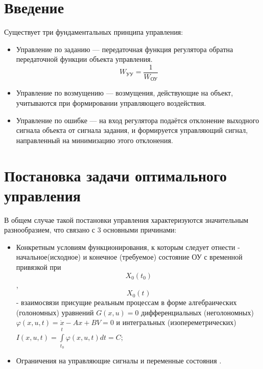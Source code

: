 \documentclass[preprint,russian,a5paper,10pt,twoside]{ncc}
\begin{document}

\setcounter{page}{2}
\thispagestyle{empty}
\mbox{}
\newpage
\tableofcontents
\newpage

\section{Введение\label{intro}}

Существует три фундаментальных принципа управления:
\begin{itemize}
\item Управление по заданию --- передаточная функция регулятора обратна передаточной функции объекта управления.
\begin{equation}
W_{\text{УУ}}=\frac{1}{W_{\text{ОУ}}}
\end{equation}
\item Управление по возмущению --- возмущения, действующие на объект, учитываются при формировании управляющего воздействия.
\item Управление по ошибке --- на вход регулятора подаётся отклонение выходного сигнала объекта от сигнала задания, и формируется управляющий сигнал, направленный на минимизацию этого отклонения.
\end{itemize}

\newpage

\section{Постановка задачи оптимального управления\label{task}}
В общем случае такой постановки управления характеризуются значительным разнообразием, что связано с 3 основными причинами:

\begin{itemize}
\item Конкретным условиям функционирования, к которым следует отнести - начальное(исходное) и конечное (требуемое) состояние ОУ с временной привязкой при \[{{X}_{0}}\left( {{t}_{0}} \right)\], \[{{X}_{0}}\left( {{t}_{}} \right)\] - взаимосвязи присущие реальным процессам в форме алгебраических (голономных) уравнений $G\left( x,u \right)=0$ дифференциальных (неголономных) $\varphi \left( x,u,t \right)=\dot{x}-Ax+BV=0$ и интегральных (изопереметрических) $I\left( x,u,t \right)=\int\limits_{{{t}_{0}}}^{{{t}_{}}}{\varphi \left( x,u,t \right)dt=C}$;
\item Ограничения на управляющие сигналы и переменные состояния .
\end{itemize}
\par
\end{document}
